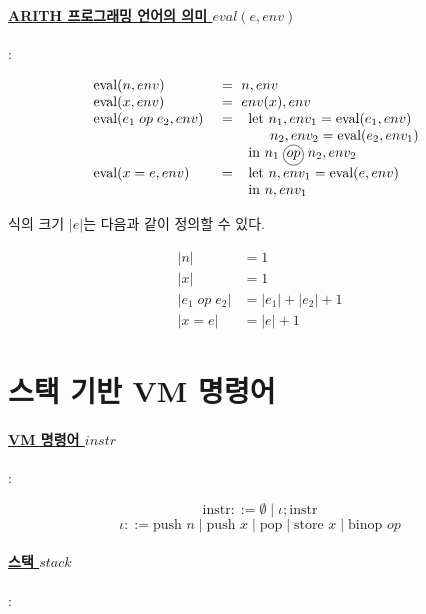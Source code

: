 \documentclass[runningheads]{llncs}
\newcommand{\circledop}[1]{%
    \tikz[baseline=(X.base)] \node[draw, shape=circle, inner sep=1pt] (X) {\ensuremath{#1}};%
}
\begin{document}
\paragraph{\underline{ARITH 프로그래밍 언어의 의미 $eval(e, env)$}}:

\[
\begin{array}{l l}
    \text{eval}(n, env) &\ = \ n, env \\
    \text{eval}(x, env) &\ = \  env(x), env \\
    \text{eval}(e_1 \; op \; e_2, env) &\ = \  
    \begin{array}[t]{l}
        \text{let } n_1, env_1 = \text{eval}(e_1, env) \\
        \quad \;\; n_2, env_2 = \text{eval}(e_2, env_1) \\
        \text{in } n_1 \; \circledop{op} \; n_2, env_2
    \end{array} \\
    \text{eval}(x = e, env) &\ = \  
    \begin{array}[t]{l}
        \text{let } n, env_1 = \text{eval}(e, env) \\
        \text{in } n, env_1
    \end{array}
\end{array}
\]

식의 크기 $|e|$는 다음과 같이 정의할 수 있다.

\[
\begin{aligned}
    |n| &= 1 \\
    |x| &= 1 \\
    |e_1 \; op \; e_2| &= |e_1| + |e_2| + 1 \\
    |x = e| &= |e| + 1
\end{aligned}
\]

\section{스택 기반 VM 명령어}

\paragraph{\underline{VM 명령어 $instr$}}:

\[
\text{instr} ::= \emptyset\mid \iota; \text{instr}
\]
\[
 \iota ::= \text{push } n\mid \text{push } x \mid \text{pop} \mid \text{store } x \mid \text{binop } op
\]

\paragraph{\underline{스택 $stack$}}:
\end{document}
